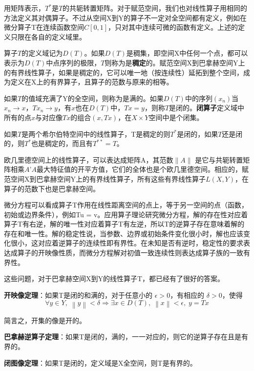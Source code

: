 用矩阵表示，$ T^* $是$ T $的共轭转置矩阵。对于赋范空间，我们也对线性算子用相同的方法定义其对偶算子。不过从空间X到Y的算子不一定对全空间都有定义，例如在微分算子T在连续函数空间$ C[0,1] $，只对其中连续可微的函数有定义。上述的定义只限在各自的定义域里。

算子$ T $的定义域记为$ D(T) $。如果$ D(T) $是稠集，即空间X中任何一个点，都可以表示为$ D(T) $中点序列的极限，$ T $则称为是\textbf{稠定}的。赋范空间X到巴拿赫空间Y上的有界线性算子，如果是稠定的，它可以唯一地（按连续性）延拓到整个空间，成为定义在X上的有界算子，且算子的范数与原来的相等。

如果$ T $的值域充满了Y的全空间，则称为是满的。如果$ D(T) $中的序列$ (x_n) $当$ x_n \rightarrow x，Tx_n \rightarrow y $，有$ x $也在$ D(T) $中，$ Tx=y $，则称$ T $是闭的。\textbf{闭算子}定义域中所有的点$ x $与对应像$ Tx $的组合$ (x, Tx) $，在$ X\times Y $空间中是个闭集。

如果$ T $是两个希尔伯特空间中的线性算子，T是稠定的则$ T^* $是闭的，如果$ T $还是闭的，则$ T^* $也是稠定的，而且有$ T^{**}=T $。

欧几里德空间上的线性算子，可以表达成矩阵A，其范数$ \|A\| $
是它与共轭转置矩阵相乘$ A’A $最大特征值的开平方值，它们的全体也是个欧几里德空间。相应的，赋范空间X到巴拿赫空间Y上的有界线性算子，所有这些有界线性算子$ L(X,Y) $，在算子的范数下也是巴拿赫空间。

微分方程可以看成算子T作用在线性距离空间的点上，等于另一空间的点（函数，初始或边界条件），例如Tu = v。应用算子理论研究微分方程，解的存在性对应着算子T有右逆，解的唯一性对应着算子T有左逆，所以T的逆算子存在意味着解的存在和唯一性。解的稳定性说，当参数、边界或初始条件变化很小时，解也应该变化很小，这对应着逆算子的连续性即有界性。在未知是否有逆时，稳定性的要求表达成算子的开映像性质，而微分方程解对初值一致连续性则表达成算子族的一致有界性。

这些问题，对于巴拿赫空间X到Y的线性算子T，都已经有了很好的答案。

\textbf{开映像定理}：如果T是闭的和满的，对于任意小的 $ \epsilon >0 $，有相应的 $ \delta >0 $，使得
\begin{equation}
	\forall y\in Y, \; \left \| y \right \| < \delta \Rightarrow \exists x \in D(T), \; \left\|x\right\|<\epsilon , \; y=Tx
\end{equation}

简言之，开集的像是开的。

\textbf{巴拿赫逆算子定理}：如果T是闭的，满的，一一对应的，则它的逆算子存在且是有界的。

\textbf{闭图像定理}：如果T是闭的，定义域是X全空间，则T是有界的。


